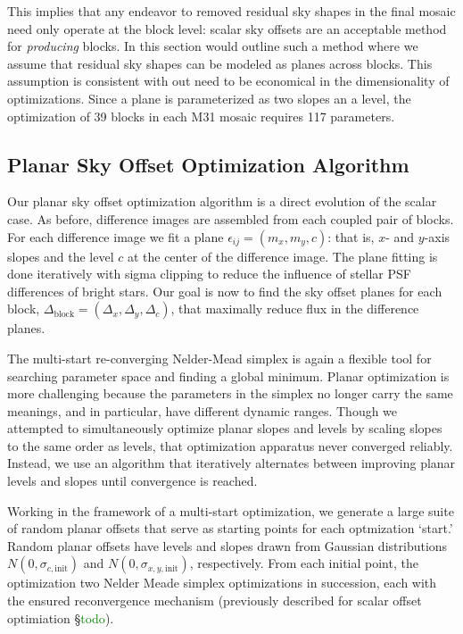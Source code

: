 \documentclass[iop]{emulateapj}
\newcommand{\todo}[1]{\textcolor{green}{#1}} %
\begin{document}
This implies that any endeavor to removed residual sky shapes in the final mosaic need only operate at the block level: scalar sky offsets are an acceptable method for \emph{producing} blocks. In this section would outline such a method where we assume that residual sky shapes can be modeled as planes across blocks. This assumption is consistent with out need to be economical in the dimensionality of optimizations. Since a plane is parameterized as two slopes an a level, the optimization of 39 blocks in each M31 mosaic requires 117 parameters.

\subsection{Planar Sky Offset Optimization Algorithm}

Our planar sky offset optimization algorithm is a direct evolution of the scalar case. As before, difference images are assembled from each coupled pair of blocks. For each difference image we fit a plane $\epsilon_{ij} = (m_x, m_y, c)$: that is, $x$- and $y$-axis slopes and the level $c$ at the center of the difference image. The plane fitting is done iteratively with sigma clipping to reduce the influence of stellar PSF differences of bright stars. Our goal is now to find the sky offset planes for each block, $\Delta_\mathrm{block} = (\Delta_x, \Delta_y, \Delta_c)$, that maximally reduce flux in the difference planes.

The multi-start re-converging Nelder-Mead simplex is again a flexible tool for searching parameter space and finding a global minimum. Planar optimization is more challenging because the parameters in the simplex no longer carry the same meanings, and in particular, have different dynamic ranges. Though we attempted to simultaneously optimize planar slopes and levels by scaling slopes to the same order as levels, that optimization apparatus never converged reliably. Instead, we use an algorithm that iteratively alternates between improving planar levels and slopes until convergence is reached.

Working in the framework of a multi-start optimization, we generate a large suite of random planar offsets that serve as starting points for each optmization `start.' Random planar offsets have levels and slopes drawn from Gaussian distributions $N(0, \sigma_{c,\mathrm{init}})$ and $N(0, \sigma_{x,y,\mathrm{init}})$, respectively. From each initial point, the optimization two Nelder Meade simplex optimizations in succession, each with the ensured reconvergence mechanism (previously described for scalar offset optimiation \S \todo{todo}).
\end{document}
